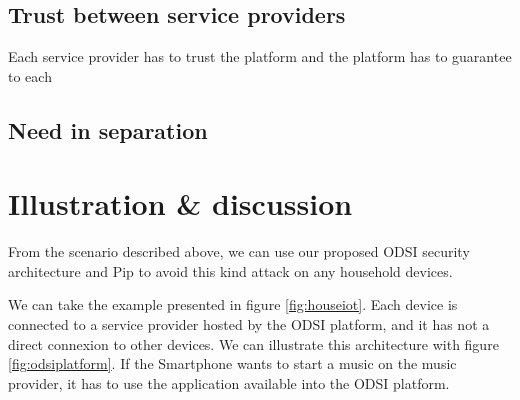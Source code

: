 \documentclass[conference]{IEEEtran}
\begin{document}
\subsection{Trust between service providers}

Each service provider has to trust the platform and the platform has to guarantee to each 






\subsection{Need in separation}


\section{Illustration \& discussion}

From the scenario described above\cite{Sivaraman2016}, we can use our proposed ODSI security architecture and Pip to avoid this kind attack on any household devices.

We can take the example presented in figure \ref{fig:houseiot}. Each device is connected to a service provider hosted by the ODSI platform, and it has not a direct connexion to other devices. We can illustrate this architecture with figure \ref{fig:odsiplatform}. If the Smartphone wants to start a music on the music provider, it has to use the application available into the ODSI platform.
\end{document}
